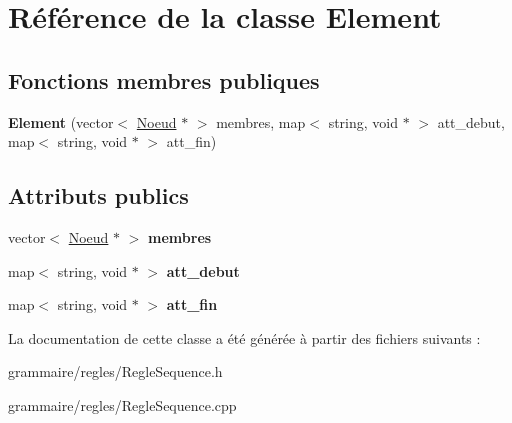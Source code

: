\hypertarget{class_element}{\section{Référence de la classe Element}
\label{class_element}
}
\subsection*{Fonctions membres publiques}
\begin{DoxyCompactItemize}
\item 
\hypertarget{class_element_a40db52eb2dc4be68ea32a8e4c021f3f6}{{\bfseries Element} (vector$<$ \hyperlink{class_noeud}{Noeud} $\ast$ $>$ membres, map$<$ string, void $\ast$ $>$ att\-\_\-debut, map$<$ string, void $\ast$ $>$ att\-\_\-fin)}\label{class_element_a40db52eb2dc4be68ea32a8e4c021f3f6}

\end{DoxyCompactItemize}
\subsection*{Attributs publics}
\begin{DoxyCompactItemize}
\item 
\hypertarget{class_element_a56902db0137ab191d92d1ae7bd5654ed}{vector$<$ \hyperlink{class_noeud}{Noeud} $\ast$ $>$ {\bfseries membres}}\label{class_element_a56902db0137ab191d92d1ae7bd5654ed}

\item 
\hypertarget{class_element_a167169b084f5ed44115c91e858f71f26}{map$<$ string, void $\ast$ $>$ {\bfseries att\-\_\-debut}}\label{class_element_a167169b084f5ed44115c91e858f71f26}

\item 
\hypertarget{class_element_a10c972e4b3c337135eda2064b70b869b}{map$<$ string, void $\ast$ $>$ {\bfseries att\-\_\-fin}}\label{class_element_a10c972e4b3c337135eda2064b70b869b}

\end{DoxyCompactItemize}


La documentation de cette classe a été générée à partir des fichiers suivants \-:\begin{DoxyCompactItemize}
\item 
grammaire/regles/Regle\-Sequence.\-h\item 
grammaire/regles/Regle\-Sequence.\-cpp\end{DoxyCompactItemize}
